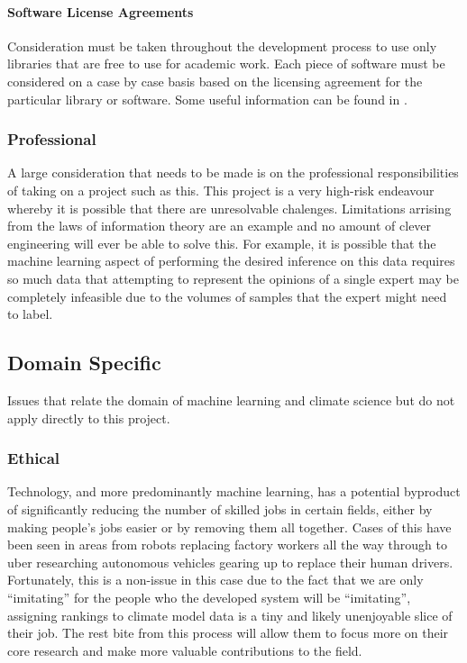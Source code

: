 \documentclass{ecmm427_assignment}
\begin{document}
\paragraph{Software License Agreements}

 Consideration must be taken throughout the development process to use
only libraries that are free to use for academic work. Each piece of software must be considered on a case by case basis based on the licensing agreement for
the particular library or software. Some useful information can be found in \cite{ethicalandlegal}.


\subsubsection{Professional}

 A large consideration that needs to be made is on the professional
responsibilities of taking on a project such as this. This project
is a very high-risk endeavour whereby it is possible that there are unresolvable chalenges. Limitations arrising from the laws of information theory are an example and no amount of clever engineering will ever be able to solve this.
For example, it is possible that the machine learning aspect of performing
the desired inference on this data requires so much data that attempting
to represent the opinions of a single expert may be completely infeasible
due to the volumes of samples that the expert might need to label. 

\subsection{Domain Specific}

Issues that relate the domain of machine learning and climate science but do not apply directly to this project.

\subsubsection{Ethical}

 Technology, and more predominantly machine learning, has 
a potential byproduct of significantly reducing the number of skilled
jobs in certain fields, either by making people's jobs easier or by removing them all together.
Cases of this have been seen in areas from robots replacing factory
workers all the way through to uber researching autonomous vehicles
gearing up to replace their human drivers. Fortunately, this is a non-issue
in this case due to the fact that we are only ``imitating'' for the people who the developed
system will be ``imitating'', assigning rankings to climate model
data is a tiny and likely unenjoyable slice of their job. The rest bite
from this process will allow them to focus more on their core research
and make more valuable contributions to the field. 
\end{document}
